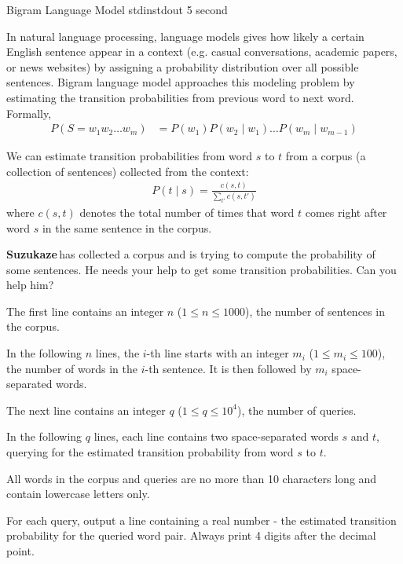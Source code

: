 \newcommand{\Suzukaze}{\textbf{\textcolor[rgb]{1,0.5,0}{Suzukaze}}\,}

\begin{problem}{Bigram Language Model}
{stdin}{stdout}
{5 second}{}{}

In natural language processing, language models gives how likely a certain English sentence appear in a context (e.g. casual conversations, academic papers, or news websites) by assigning a probability distribution over all possible sentences. Bigram language model approaches this modeling problem by estimating the transition probabilities from previous word to next word. Formally, 
\begin{align*}
	P(S = w_1 w_2 \hdots w_m) &= P(w_1)P(w_2 \mid w_1) \hdots P(w_m \mid w_{m-1})
\end{align*}

We can estimate transition probabilities from word $s$ to $t$ from a corpus (a collection of sentences) collected from the context: 
\begin{align*}
	P(t \mid s) = \frac{c(s,t)}{\sum_{t'}{c(s,t')}}
\end{align*}
where $c(s,t)$ denotes the total number of times that word $t$ comes right after word $s$ in the same sentence in the corpus. 

\Suzukaze has collected a corpus and is trying to compute the probability of some sentences. He needs your help to get some transition probabilities. Can you help him? 

\InputFile

The first line contains an integer $n$ ($1 \le n \le 1000$), the number of sentences in the corpus. 

In the following $n$ lines, the $i$-th line starts with an integer $m_i$ ($1 \le m_i \le 100$), the number of words in the $i$-th sentence. It is then followed by $m_i$ space-separated words. 

The next line contains an integer $q$ ($1 \le q \le 10^4$), the number of queries. 

In the following $q$ lines, each line contains two space-separated words $s$ and $t$, querying for the estimated transition probability from word $s$ to $t$. 

All words in the corpus and queries are no more than 10 characters long and contain lowercase letters only. 

\OutputFile

For each query, output a line containing a real number - the estimated transition probability for the queried word pair. Always print 4 digits after the decimal point. 


\end{problem}
